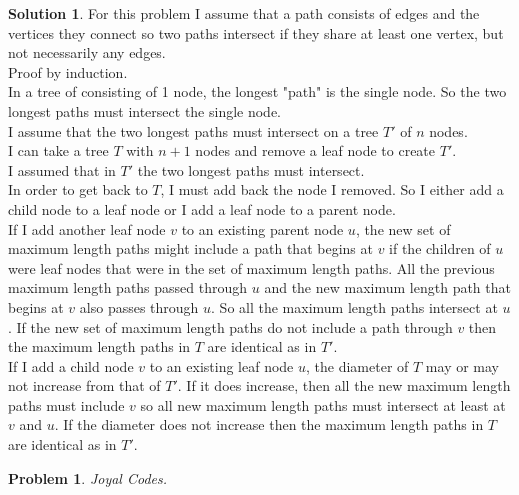\documentclass{article}
\newtheorem{problem}{Problem}
\theoremstyle{definition}
\newtheorem*{solution}{Solution}
\begin{document}
\begin{solution}

For this problem I assume that a path consists of edges and the vertices they connect so two paths intersect if they share at least one vertex, but not necessarily any edges.\\

Proof by induction.\\

In a tree of consisting of 1 node, the longest "path" is the single node. So the two longest paths must intersect the single node.\\

I assume that the two longest paths must intersect on a tree \(T'\) of \(n\) nodes.\\

I can take a tree \(T\) with \(n+1\) nodes and remove a leaf node to create \(T'\).\\

I assumed that in \(T'\) the two longest paths must intersect.\\

In order to get back to \(T\), I must add back the node I removed. So I either add a child node to a leaf node or I add a leaf node to a parent node.\\

If I add another leaf node \(v\) to an existing parent node \(u\), the new set of maximum length paths might include a path that begins at \(v\) if the children of \(u\) were leaf nodes that were in the set of maximum length paths. All the previous maximum length paths passed through \(u\) and the new maximum length path that begins at \(v\) also passes through \(u\). So all the maximum length paths intersect at \(u\). If the new set of maximum length paths do not include a path through \(v\) then the maximum length paths in \(T\) are identical as in \(T'\).\\

If I add a child node \(v\) to an existing leaf node \(u\), the diameter of \(T\) may or may not increase from that of \(T'\). If it does increase, then all the new maximum length paths must include \(v\) so all new maximum length paths must intersect at least at \(v\) and \(u\). If the diameter does not increase then the maximum length paths in \(T\) are identical as in \(T'\).

\end{solution}

\begin{problem} 

Joyal Codes.

\end{problem}
\end{document}
